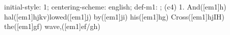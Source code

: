initial-style: 1;
centering-scheme: english;
def-m1: \grealign;
(c4) 1. And([em1]h) hal([em1]hjkv)lowed([em1]j) by([em1]ji) his([em1]hg) Cross([em1]hjIH) the([em1]gf) wave,([em1]ef/gh)